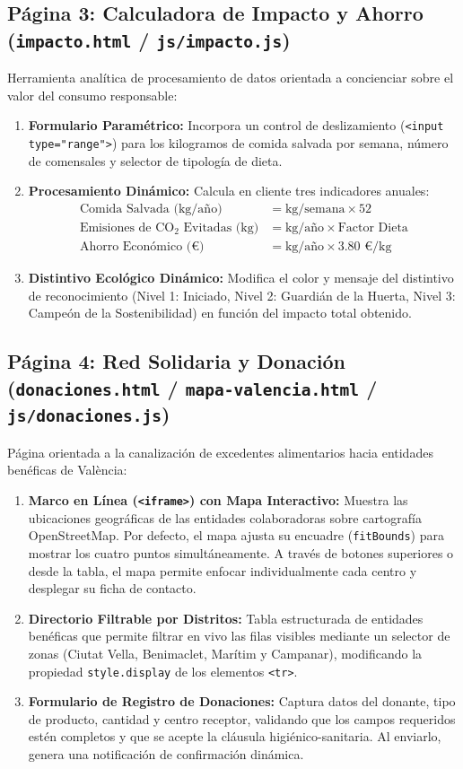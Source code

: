 \documentclass[11pt,a4paper]{article}
\begin{document}
\subsection{Página 3: Calculadora de Impacto y Ahorro (\texttt{impacto.html} / \texttt{js/impacto.js})}
Herramienta analítica de procesamiento de datos orientada a concienciar sobre el valor del consumo responsable:
\begin{enumerate}
    \item \textbf{Formulario Paramétrico:} Incorpora un control de deslizamiento (\texttt{<input type="range">}) para los kilogramos de comida salvada por semana, número de comensales y selector de tipología de dieta.
    \item \textbf{Procesamiento Dinámico:} Calcula en cliente tres indicadores anuales:
    \begin{align*}
        \text{Comida Salvada (kg/año)} &= \text{kg/semana} \times 52 \\
        \text{Emisiones de CO}_2\text{ Evitadas (kg)} &= \text{kg/año} \times \text{Factor Dieta} \\
        \text{Ahorro Económico (€)} &= \text{kg/año} \times 3.80\text{ €/kg}
    \end{align*}
    \item \textbf{Distintivo Ecológico Dinámico:} Modifica el color y mensaje del distintivo de reconocimiento (Nivel 1: Iniciado, Nivel 2: Guardián de la Huerta, Nivel 3: Campeón de la Sostenibilidad) en función del impacto total obtenido.
\end{enumerate}

\subsection{Página 4: Red Solidaria y Donación (\texttt{donaciones.html} / \texttt{mapa-valencia.html} / \texttt{js/donaciones.js})}
Página orientada a la canalización de excedentes alimentarios hacia entidades benéficas de València:
\begin{enumerate}
    \item \textbf{Marco en Línea (\texttt{<iframe>}) con Mapa Interactivo:} Muestra las ubicaciones geográficas de las entidades colaboradoras sobre cartografía OpenStreetMap. Por defecto, el mapa ajusta su encuadre (\texttt{fitBounds}) para mostrar los cuatro puntos simultáneamente. A través de botones superiores o desde la tabla, el mapa permite enfocar individualmente cada centro y desplegar su ficha de contacto.
    \item \textbf{Directorio Filtrable por Distritos:} Tabla estructurada de entidades benéficas que permite filtrar en vivo las filas visibles mediante un selector de zonas (Ciutat Vella, Benimaclet, Marítim y Campanar), modificando la propiedad \texttt{style.display} de los elementos \texttt{<tr>}.
    \item \textbf{Formulario de Registro de Donaciones:} Captura datos del donante, tipo de producto, cantidad y centro receptor, validando que los campos requeridos estén completos y que se acepte la cláusula higiénico-sanitaria. Al enviarlo, genera una notificación de confirmación dinámica.
\end{enumerate}
\end{document}
